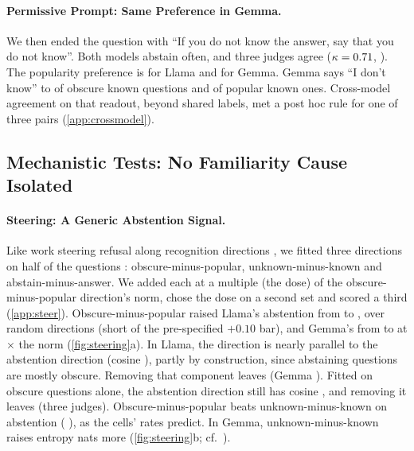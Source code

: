 \documentclass{article}
\newcommand{\idk}{``I don't know''}
\begin{document}
\paragraph{Permissive Prompt: Same Preference in Gemma.} We then ended the question with ``If you do not know the answer, say that you do not know''. Both models abstain often, and three judges agree ($\kappa=0.71$, \pmGemmaKappa). The popularity preference is \pmLlamaDiff{} \pmLlamaDiffCI{} for Llama and \pmGemmaDiff{} \pmGemmaDiffCI{} for Gemma. Gemma says \idk{} to \pmGemmaObsKnown{} of obscure known questions and \pmGemmaPopKnown{} of popular known ones. Cross-model agreement on that readout, beyond shared labels, met a post hoc rule for one of three pairs (\cref{app:crossmodel}).

\subsection{Mechanistic Tests: No Familiarity Cause Isolated}
\label{sec:mech}

\paragraph{Steering: A Generic Abstention Signal.} Like work steering refusal along recognition directions \citep{ferrando2025iknow,brzezinka2026familiarity}, we fitted three directions on half of the questions \citep{arditi2024refusal,rimsky2024caa}: obscure-minus-popular, unknown-minus-known and abstain-minus-answer. We added each at a multiple (the dose) of the obscure-minus-popular direction's norm, chose the dose on a second set and scored a third (\cref{app:steer}). Obscure-minus-popular raised Llama's abstention from \svLlamaNone{} to \svLlamaFam, \svLlamaDOne{} \svLlamaDOneCI{} over random directions (short of the pre-specified $+0.10$ bar), and Gemma's from \svGemmaNone{} to \svGemmaFam{} at \svGemmaDose$\times$ the norm (\cref{fig:steering}a). In Llama, the direction is nearly parallel to the abstention direction (cosine \svLlamaCos), partly by construction, since abstaining questions are mostly obscure. Removing that component leaves \svLlamaDTwo{} \svLlamaDTwoCI{} (Gemma \svGemmaDTwo{} \svGemmaDTwoCI). Fitted on obscure questions alone, the abstention direction still has cosine \wlLlamaCos, and removing it leaves \wlLlamaDTwo{} \wlLlamaDTwoCI{} (three judges). Obscure-minus-popular beats unknown-minus-known on abstention (\svLlamaDThree{} \svLlamaDThreeCI), as the cells' rates predict. In Gemma, unknown-minus-known raises entropy \svGemmaDFour{} \svGemmaDFourCI{} nats more (\cref{fig:steering}b; cf.\ \citealp{che2026steering}).
\end{document}
